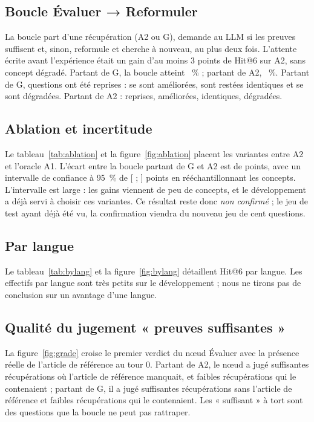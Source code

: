 \subsection{Boucle Évaluer → Reformuler}
La boucle part d'une récupération (A2 ou G), demande au LLM si les preuves suffisent et, sinon, reformule et cherche à
nouveau, au plus deux fois. L'attente écrite avant l'expérience était un gain d'au moins 3 points de Hit@6 sur A2, sans
concept dégradé. Partant de G, la boucle atteint \NLoopLoopGHitsix~\% ; partant de A2, \NLoopLoopAtwoHitsix~\%.
Partant de G, \NLoopGRetried{} questions ont été reprises : \NLoopGBetter{} se sont améliorées, \NLoopGSame{} sont restées
identiques et \NLoopGWorse{} se sont dégradées. Partant de A2 : \NLoopAtwoRetried{} reprises, \NLoopAtwoBetter{} améliorées,
\NLoopAtwoSame{} identiques, \NLoopAtwoWorse{} dégradées.

\subsection{Ablation et incertitude}
Le tableau~\ref{tab:ablation} et la figure~\ref{fig:ablation} placent les variantes entre A2 et l'oracle A1. L'écart
entre la boucle partant de G et A2 est de \NLoopLoopGDiff{} points, avec un intervalle de confiance à 95~\% de
[\NLoopLoopGDifflo{} ; \NLoopLoopGDiffhi] points en rééchantillonnant les concepts. L'intervalle est large : les gains
viennent de peu de concepts, et le développement a déjà servi à choisir ces variantes. Ce résultat reste donc
\emph{non confirmé} ; le jeu de test ayant déjà été vu, la confirmation viendra du nouveau jeu de cent questions.



\subsection{Par langue}
Le tableau~\ref{tab:bylang} et la figure~\ref{fig:bylang} détaillent Hit@6 par langue. Les effectifs par langue sont très
petits sur le développement ; nous ne tirons pas de conclusion sur un avantage d'une langue.



\subsection{Qualité du jugement « preuves suffisantes »}
La figure~\ref{fig:grade} croise le premier verdict du nœud Évaluer avec la présence réelle de l'article de référence
au tour 0. Partant de A2, le nœud a jugé suffisantes \NGradeAtwoEnoughMiss{} récupérations où l'article de référence
manquait, et faibles \NGradeAtwoWeakHit{} récupérations qui le contenaient ; partant de G, il a jugé
suffisantes \NGradeGEnoughMiss{} récupérations sans l'article de référence et faibles \NGradeGWeakHit{} récupérations
qui le contenaient. Les « suffisant » à tort sont des questions que la boucle ne peut pas rattraper.


